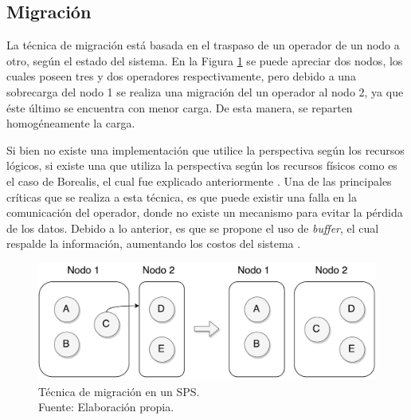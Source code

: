 \subsection{Migración}
\label{sec:migracionBC}

La técnica de migración está basada en el traspaso de un operador de un nodo a otro, según el estado del sistema. En la Figura \ref{fig:migracion} se puede apreciar dos nodos, los cuales poseen tres y dos operadores respectivamente, pero debido a una sobrecarga del nodo 1 se realiza una migración del un operador al nodo 2, ya que \normalsize{éste último} se encuentra con menor carga. De esta manera, se reparten homogéneamente la carga.

Si bien no existe una implementación que utilice la perspectiva según los recursos lógicos, si existe una que utiliza la perspectiva según los recursos físicos como es el caso de Borealis, el cual fue explicado anteriormente \citep{XingZH05}. Una de las principales críticas que se realiza a esta técnica, es que puede existir una falla en la comunicación del operador, donde no existe un mecanismo para evitar la pérdida de los datos. Debido a lo anterior, es que se propone el uso de \textit{buffer}, el cual respalde la información, aumentando los costos del sistema \citep{PittauACA07}.

\begin{figure}[!ht]
	\centering
	\includegraphics[scale=0.45]{images/Migracion.pdf}
	\caption[Técnica de migración en un SPS.]{Técnica de migración en un SPS.\\Fuente: Elaboración propia.}
	\label{fig:migracion}
\end{figure}

